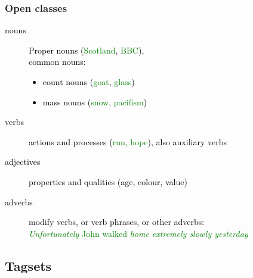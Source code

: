 \documentclass{beamer}             %
\begin{document}
\begin{frame}
  \frametitle{Open classes}
  \textcolor{black}{
  \begin{description}
  \item[nouns] Proper nouns (\textcolor{green}{Scotland}, \textcolor{green}{BBC}),\\
    common nouns:
    \begin{itemize}
    \item count nouns (\textcolor{green}{goat},
      \textcolor{green}{glass})
    \item mass nouns (\textcolor{green}{snow},
      \textcolor{green}{pacifism})
    \end{itemize}
  \item[verbs] actions and processes (\textcolor{green}{run},
    \textcolor{green}{hope}), also auxiliary verbs
  \item[adjectives] properties and qualities (age, colour, value)
  \item[adverbs] modify verbs, or verb phrases, or other adverbs:\\
    \textcolor{green}{\emph{Unfortunately} John walked \emph{home
        extremely slowly yesterday}}
  \end{description}}
\end{frame}


\subsection{Tagsets}
\end{document}
